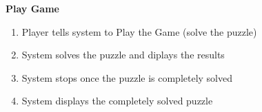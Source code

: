 \documentclass[letterpaper]{article}
\begin{document}
\noindent
\textbf{Play Game}
\begin{enumerate}
\item Player tells system to Play the Game (solve the puzzle)
\item System solves the puzzle and diplays the results
\item System stops once the puzzle is completely solved
\item System displays the completely solved puzzle
\end{enumerate}
\end{document}
